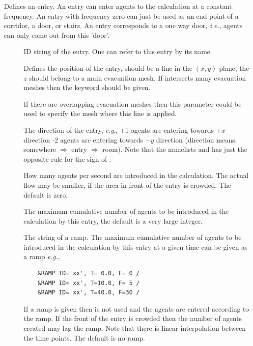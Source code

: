 \documentclass[12pt,a4paper,final,twoside]{stylevk}
\begin{document}
\noindent Defines an entry.  An entry can enter agents to the
calculation at a constant frequency.  An entry with frequency zero can
just be used as an end point of a corridor, a door, or stairs.  An
entry corresponds to a one way door, \emph{i.e.}, agents can only come
out from this 'door'.

\begin{description}
%
\item[] ID string of the entry.  One can refer to this entry
  by its name.
%
\item[] Defines the position of the entry, should be a line
  in the $(x,y)$ plane, the $z$ should belong to a main evacuation
  mesh.  If  intersects many evacuation meshes then the
  keyword  should be given.
%
\item[] If there are overlapping evacuation meshes
  then this parameter could be used to specify the mesh where this
   line is applied.
%
\item[] The direction of the entry, \emph{e.g}., +1 agents
  are entering towards $+x$ direction -2 agents are entering towards
  $-y$ direction (direction means: somewhere $\Rightarrow$ entry
  $\Rightarrow$ room).  Note that the namelists  and
   has just the opposite rule for the sign of .
%
\item[] How many agents per second are introduced in
  the calculation. The actual flow may be smaller, if the area in
  front of the entry is crowded.  The default is zero.
%
\item[] The maximum cumulative number of agents to
  be introduced in the calculation by this entry, the default is a
  very large integer.
%
\item[] The  string of a ramp.  The
  maximum cumulative number of agents to be introduced in the
  calculation by this entry at a given time can be given as a ramp
  \emph{e.g.}, 
\begin{verbatim}
    &RAMP ID='xx', T= 0.0, F= 0 /
    &RAMP ID='xx', T=10.0, F= 5 /
    &RAMP ID='xx', T=40.0, F=30 /
\end{verbatim}
  If a ramp is given then  is not used and the agents
  are entered according to the ramp.  If the front of the entry is
  crowded then the number of agents created may lag the ramp.
  Note that there is linear interpolation between the time points.
  The default is no ramp.

\end{description}
\end{document}
